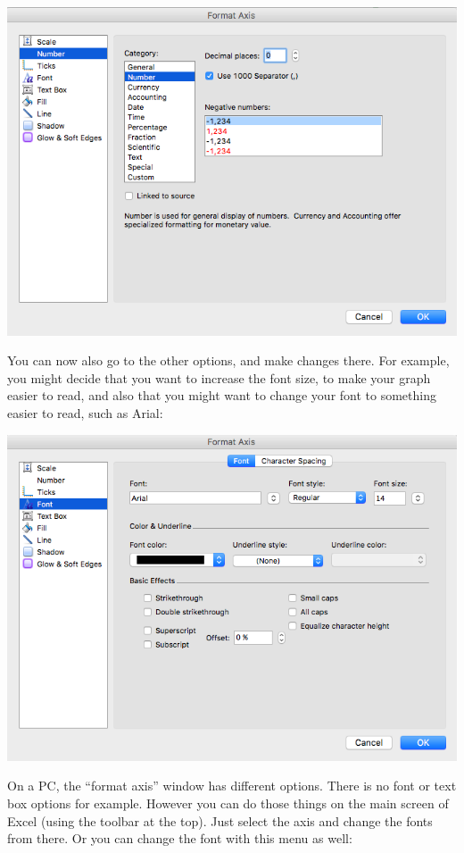 \documentclass[]{book}
\theoremstyle{definition}
\theoremstyle{definition}
\theoremstyle{definition}
\theoremstyle{remark}
\begin{document}
\includegraphics{imgs/desc_viz_8.png}

You can now also go to the other options, and make changes there. For
example, you might decide that you want to increase the font size, to
make your graph easier to read, and also that you might want to change
your font to something easier to read, such as Arial:

\includegraphics{imgs/desc_viz_9.png}

On a PC, the ``format axis'' window has different options. There is no
font or text box options for example. However you can do those things on
the main screen of Excel (using the toolbar at the top). Just select the
axis and change the fonts from there. Or you can change the font with
this menu as well:
\end{document}

